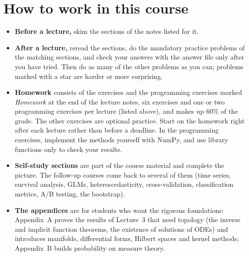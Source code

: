 \documentclass[11pt]{article}
\begin{document}
\section*{How to work in this course}

\begin{itemize}
    \item \textbf{Before a lecture,} skim the sections of the notes listed for it.
    \item \textbf{After a lecture,} reread the sections, do the mandatory practice problems of the matching sections, and check your answers with the answer file only after you have tried. Then do as many of the other problems as you can; problems marked with a star are harder or more surprising.
    \item \textbf{Homework} consists of the exercises and the programming exercises marked \emph{Homework} at the end of the lecture notes, six exercises and one or two programming exercises per lecture (listed above), and makes up $60\%$ of the grade. The other exercises are optional practice. Start on the homework right after each lecture rather than before a deadline. In the programming exercises, implement the methods yourself with NumPy, and use library functions only to check your results.
    \item \textbf{Self-study sections} are part of the course material and complete the picture. The follow-up courses come back to several of them (time series, survival analysis, GLMs, heteroscedasticity, cross-validation, classification metrics, A/B testing, the bootstrap).
    \item \textbf{The appendices} are for students who want the rigorous foundations: Appendix~A proves the results of Lecture~3 that need topology (the inverse and implicit function theorems, the existence of solutions of ODEs) and introduces manifolds, differential forms, Hilbert spaces and kernel methods; Appendix~B builds probability on measure theory.
\end{itemize}
\end{document}
